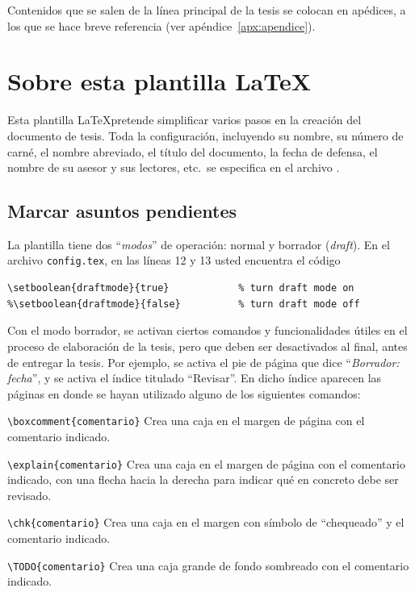 Contenidos que se salen de la línea principal de la tesis se colocan
en apédices, a los que se hace breve referencia (ver
apéndice~\ref{apx:apendice}).

\section{Sobre esta plantilla \LaTeX}

Esta plantilla \LaTeX pretende simplificar varios pasos en la creación
del documento de tesis.  Toda la configuración, incluyendo su nombre,
su número de carné, el nombre abreviado, el título del documento, la
fecha de defensa, el nombre de su asesor y sus lectores, etc.\ se
especifica en el archivo .

\subsection{Marcar asuntos pendientes}

La plantilla tiene dos ``\emph{modos}'' de operación: normal y
borrador (\emph{draft}).  En el archivo \texttt{config.tex}, en las
líneas 12 y 13 usted encuentra el código

\begin{verbatim}
\setboolean{draftmode}{true}            % turn draft mode on
%\setboolean{draftmode}{false}          % turn draft mode off
\end{verbatim}

Con el modo borrador, se activan ciertos comandos y funcionalidades
útiles en el proceso de elaboración de la tesis, pero que deben ser
desactivados al final, antes de entregar la tesis.  Por ejemplo, se
activa el pie de página que dice ``\emph{Borrador: fecha}'', y se
activa el índice titulado ``Revisar''.  En dicho índice aparecen las
páginas en donde se hayan utilizado alguno de los siguientes comandos:
\begin{compactitem}
\item \verb+\boxcomment{comentario}+ Crea una caja en el margen de página con
  el comentario indicado.
\item \verb+\explain{comentario}+ Crea una caja en el margen de página con
  el comentario indicado, con una flecha hacia la derecha para indicar qué en
  concreto debe ser revisado.
\item \verb+\chk{comentario}+ Crea una caja en el margen con símbolo de
  ``chequeado'' y el comentario indicado.
\item \verb+\TODO{comentario}+ Crea una caja grande de fondo sombreado con el
  comentario indicado.
\end{compactitem}

